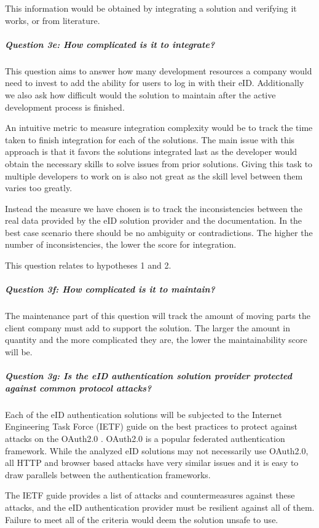 This information would be obtained by integrating a solution and verifying it works, or from literature.

\subparagraph{Question 3e: How complicated is it to integrate?}\noindent

This question aims to answer how many development resources a company would need to invest to add the ability for users to log in with their eID. Additionally we also ask how difficult would the solution to maintain after the active development process is finished.

An intuitive metric to measure integration complexity would be to track the time taken to finish integration for each of the solutions. The main issue with this approach is that it favors the solutions integrated last as the developer would obtain the necessary skills to solve issues from prior solutions. Giving this task to multiple developers to work on is also not great as the skill level between them varies too greatly.

Instead the measure we have chosen is to track the inconsistencies between the real data provided by the eID solution provider and the documentation. In the best case scenario there should be no ambiguity or contradictions. The higher the number of inconsistencies, the lower the score for integration.

This question relates to hypotheses 1 and 2.

\subparagraph{Question 3f: How complicated is it to maintain?}\noindent

The maintenance part of this question will track the amount of moving parts the client company must add to support the solution. The larger the amount in quantity and the more complicated they are, the lower the maintainability score will be.

\subparagraph{Question 3g: Is the eID authentication solution provider protected against common protocol attacks?}\noindent

Each of the eID authentication solutions will be subjected to the Internet Engineering Task Force (IETF) guide on the best practices to protect against attacks on the OAuth2.0 \cite{ietf-oauth-security-topics-19}. OAuth2.0 \cite{rfc6749} is a popular federated authentication framework. While the analyzed eID solutions may not necessarily use OAuth2.0, all HTTP and browser based attacks have very similar issues and it is easy to draw parallels between the authentication frameworks.

The IETF guide provides a list of attacks and countermeasures against these attacks, and the eID authentication provider must be resilient against all of them. Failure to meet all of the criteria would deem the solution unsafe to use.

